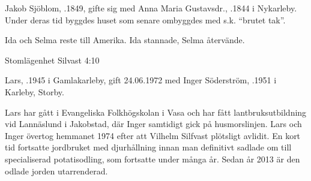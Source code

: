 %
Jakob Sjöblom, .1849, gifte sig med Anna Maria Gustavsdr., .1844 i Nykarleby. Under deras tid byggdes huset som senare ombyggdes med s.k. ``brutet tak''.
\begin{jhchildren}
  \item {}
  \item {}
  \item {}
  \item {}
  \item {}
  \item {}
  \item {}
\end{jhchildren}

Ida och Selma reste till Amerika. Ida stannade, Selma återvände.



%

Stomlägenhet Silvast 4:10


%
Lars, .1945 i Gamlakarleby, gift 24.06.1972 med Inger Söderström, .1951 i Karleby, Storby.
\begin{jhchildren}
  \item {}
  \item {}
  \item {}
\end{jhchildren}
Lars har gått i Evangeliska Folkhögskolan i Vasa och har fått lantbruksutbildning vid Lannäslund i Jakobstad, där Inger samtidigt gick på husmorslinjen. Lars och Inger övertog hemmanet 1974 efter att Vilhelm Silfvast plötsligt avlidit. En kort tid fortsatte jordbruket med djurhållning innan man definitivt sadlade om till specialiserad potatisodling, som  fortsatte under många år. Sedan år 2013  är den odlade jorden utarrenderad.

